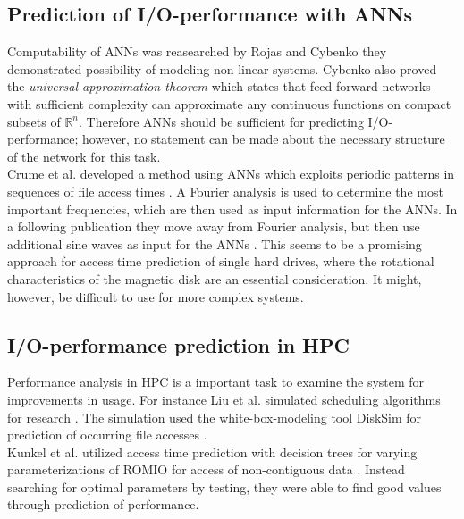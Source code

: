 \documentclass{superfri}
\begin{document}
\subsection{Prediction of I/O-performance with ANNs}
Computability of ANNs was reasearched by Rojas \cite{Rojas:1996:NNS:235222} and Cybenko \cite{cybenko:mcss} they demonstrated possibility of modeling non linear systems. Cybenko also proved the \textit{universal approximation theorem} which states that feed-forward networks with sufficient complexity can approximate any continuous functions on compact subsets of $\mathbb{R}^n$.
Therefore ANNs should be sufficient for predicting I/O-performance; however, no statement can be made about the necessary structure of the network for this task.\\
Crume et al. developed a method using ANNs which exploits periodic patterns in sequences of file access times \cite{Crume:2013:FML:2538542.2538561}.
A Fourier analysis is used to determine the most important frequencies, which are then used as input information for the ANNs.
In a following publication they move away from Fourier analysis, but then use additional sine waves as input for the ANNs \cite{crumelatent}.
This seems to be a promising approach for access time prediction of single hard drives, where the rotational characteristics of the magnetic disk are an essential consideration. It might, however, be difficult to use for more complex systems.

\subsection{I/O-performance prediction in HPC}
Performance analysis in HPC is a important task to examine the system for improvements in usage.
For instance Liu et al. simulated scheduling algorithms for research \cite{liu2011towards}. 
The simulation used the white-box-modeling tool DiskSim for prediction of occurring file accesses \cite{Bucy08thedisksim}.\\
Kunkel et al. utilized access time prediction with decision trees for varying parameterizations of ROMIO for access of non-contiguous data \cite{UMLTPTPONI15}. Instead searching for optimal parameters by testing, they were able to find good values through prediction of performance.
\end{document}
